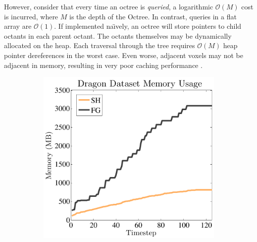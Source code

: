 \documentclass[10pt,twocolumn,letterpaper]{article}
\begin{document}
However, consider that every time an octree is \emph{queried},  a
logarithmic $\mathcal{O}(M)$ cost is incurred, where $M$ is the depth of the
Octree. In contrast, queries in a flat array are $\mathcal{O}(1)$.  If implemented na\"{\i}vely, an
octree will store pointers to child octants in each parent octant. The octants
themselves may be dynamically allocated on the heap. Each traversal through the
tree requires $\mathcal{O}(M)$ heap pointer dereferences in the worst case.
Even worse, adjacent voxels may not be adjacent in memory, resulting in very
poor caching performance \cite{CacheStructures}.

\begin{figure}
  \centering
    \begin{minipage}{0.25\linewidth}
	 \begin{subfigure}{1.0\linewidth} \centering
			\includegraphics[width=1.0\textwidth]{img/memoryusage.pdf}
			 \caption{} 
			 \label{fig:memory_data}
		 \end{subfigure}  
		  \begin{subfigure}{1.0\linewidth} \centering

\end{subfigure}
\end{minipage}
\end{figure}
\end{document}
